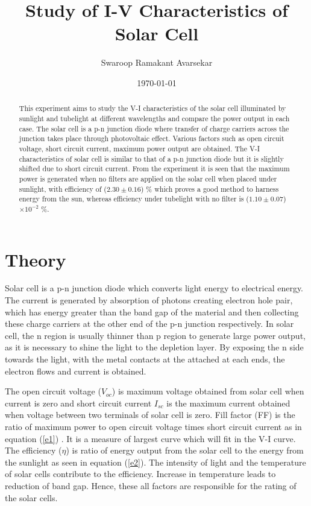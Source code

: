\documentclass[a4paper, amsfonts, amssymb, amsmath, reprint, showkeys, nofootinbib, twoside]{revtex4-1}
\begin{document}
\title{Study of I-V Characteristics of Solar Cell}
\author{Swaroop Ramakant Avarsekar}
\date{\today}

\begin{abstract}
This experiment aims to study the V-I characteristics of the solar cell illuminated by sunlight and tubelight at different wavelengths and compare the power output in each case. The solar cell is a p-n junction diode where transfer of charge carriers across the junction takes place through photovoltaic effect. Various factors such as open circuit voltage, short circuit current, maximum power output are obtained. The V-I characteristics of solar cell is similar to that of a p-n junction diode but it is slightly shifted due to short circuit current. From the experiment it is seen that the maximum power is generated when no filters are applied on the solar cell when placed under sunlight, with efficiency of ($2.30\pm0.16$) \% which proves a good method to harness energy from the sun, whereas efficiency under tubelight with no filter is ($1.10\pm0.07$)$\times10^{-2}$ \%.
\end{abstract}
	
	
\maketitle

\section{Theory}
Solar cell is a p-n junction diode which converts light energy to electrical energy. The current is generated by absorption of photons creating electron hole pair, which has energy greater than the band gap of the material and then collecting these charge carriers at the other end of the p-n junction respectively. In solar cell, the n region is usually thinner than p region to generate large power output, as it is necessary to shine the light to the depletion layer. By exposing the n side towards the light, with the metal contacts at the attached at each ends, the electron flows and current is obtained. 

The open circuit voltage ($V_{oc}$) is maximum voltage obtained from solar cell when current is zero and short circuit current {$I_{sc}$} is the maximum current obtained when voltage between two terminals of solar cell is zero.  Fill factor (FF) is the ratio of maximum power to open circuit voltage times short circuit current as in equation (\ref{e1}) . It is a measure of largest curve which will fit in the V-I curve. The efficiency ($\eta$) is ratio of energy output from the solar cell to the energy from the sunlight as seen in equation (\ref{e2}). The intensity of light and the temperature of solar cells contribute to the efficiency. Increase in temperature leads to reduction of band gap. Hence, these all factors are responsible for the rating of the solar cells.
\end{document}
